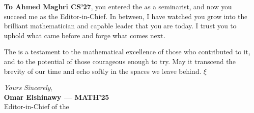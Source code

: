 \textbf{To Ahmed Maghri {\color{smjgray}CS'27}}, you entered the \SMJ as a seminarist, and now you succeed me as the Editor-in-Chief. In between, I have watched you grow into the brilliant mathematician and 
capable leader that you are today. I trust you to uphold what came before and forge what comes next.

\vspace{0.25cm}

The \SMJ is a testament to the mathematical excellence of those who
contributed to it, and to the potential of those courageous enough to try. 
May it transcend the brevity of our time and echo softly in the spaces we leave behind. $\boxed \xi$

\vspace{0.4cm}

\noindent\textit{Yours Sincerely, }\\
\textbf{Omar Elshinawy --- MATH'25}\\
Editor-in-Chief of the \SMJ
\vspace{0.15cm}

\smjgoldline{1.2pt}

\vspace{0.3cm}
\clearpage